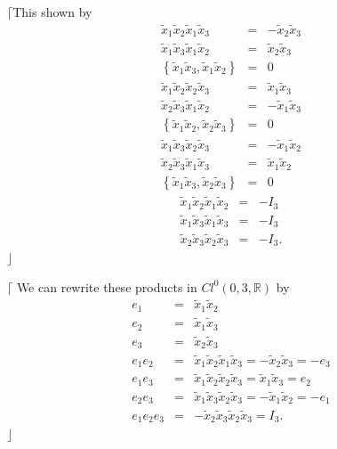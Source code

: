\documentclass[aps,preprint]{revtex4}
\begin{document}
$\lceil $This shown by 
\begin{eqnarray}
\widetilde{x}_{1}\widetilde{x}_{2}\widetilde{x}_{1}\widetilde{x}_{3} &=&-%
\widetilde{x}_{2}\widetilde{x}_{3} \\
\widetilde{x}_{1}\widetilde{x}_{3}\widetilde{x}_{1}\widetilde{x}_{2} &=&%
\widetilde{x}_{2}\widetilde{x}_{3} \\
\left\{ \widetilde{x}_{1}\widetilde{x}_{3},\widetilde{x}_{1}\widetilde{x}%
_{2}\right\} &=&0 \\
\widetilde{x}_{1}\widetilde{x}_{2}\widetilde{x}_{2}\widetilde{x}_{3} &=&%
\widetilde{x}_{1}\widetilde{x}_{3} \\
\widetilde{x}_{2}\widetilde{x}_{3}\widetilde{x}_{1}\widetilde{x}_{2} &=&-%
\widetilde{x}_{1}\widetilde{x}_{3} \\
\left\{ \widetilde{x}_{1}\widetilde{x}_{2},\widetilde{x}_{2}\widetilde{x}%
_{3}\right\} &=&0 \\
\widetilde{x}_{1}\widetilde{x}_{3}\widetilde{x}_{2}\widetilde{x}_{3} &=&-%
\widetilde{x}_{1}\widetilde{x}_{2} \\
\widetilde{x}_{2}\widetilde{x}_{3}\widetilde{x}_{1}\widetilde{x}_{3} &=&%
\widetilde{x}_{1}\widetilde{x}_{2} \\
\left\{ \widetilde{x}_{1}\widetilde{x}_{3},\widetilde{x}_{2}\widetilde{x}%
_{3}\right\} &=&0
\end{eqnarray}%
\begin{eqnarray}
\widetilde{x}_{1}\widetilde{x}_{2}\widetilde{x}_{1}\widetilde{x}_{2}
&=&-I_{3} \\
\widetilde{x}_{1}\widetilde{x}_{3}\widetilde{x}_{1}\widetilde{x}_{3}
&=&-I_{3} \\
\widetilde{x}_{2}\widetilde{x}_{3}\widetilde{x}_{2}\widetilde{x}_{3}
&=&-I_{3}.
\end{eqnarray}%
$\rfloor $

$\lceil $ We can rewrite these products in $Cl^{0}\left( 0,3,\mathbb{R}%
\right) $ by 
\begin{eqnarray}
e_{1} &=&\widetilde{x}_{1}\widetilde{x}_{2} \\
e_{2} &=&\widetilde{x}_{1}\widetilde{x}_{3} \\
e_{3} &=&\widetilde{x}_{2}\widetilde{x}_{3} \\
e_{1}e_{2} &=&\widetilde{x}_{1}\widetilde{x}_{2}\widetilde{x}_{1}\widetilde{x%
}_{3}=-\widetilde{x}_{2}\widetilde{x}_{3}=-e_{3} \\
e_{1}e_{3} &=&\widetilde{x}_{1}\widetilde{x}_{2}\widetilde{x}_{2}\widetilde{x%
}_{3}=\widetilde{x}_{1}\widetilde{x}_{3}=e_{2} \\
e_{2}e_{3} &=&\widetilde{x}_{1}\widetilde{x}_{3}\widetilde{x}_{2}\widetilde{x%
}_{3}=-\widetilde{x}_{1}\widetilde{x}_{2}=-e_{1} \\
e_{1}e_{2}e_{3} &=&-\widetilde{x}_{2}\widetilde{x}_{3}\widetilde{x}_{2}%
\widetilde{x}_{3}=I_{3}.
\end{eqnarray}%
$\rfloor $
\end{document}
